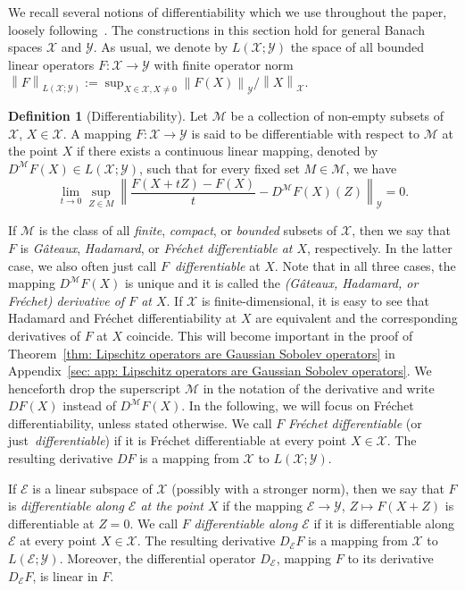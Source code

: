 \documentclass[namedate,webpdf]{ima-authoring-template-blank}
\newcommand*{\nm}[1]{{\left\|#1\right \|}}
\newcounter{counter}
\numberwithin{counter}{section}
\numberwithin{equation}{section}
\theoremstyle{plain}
\theoremstyle{definition}
\newtheorem{definition}[counter]{Definition}
\newcommand*{\cE}{\mathcal{E}}
\newcommand*{\cM}{\mathcal{M}}
\newcommand*{\cX}{\mathcal{X}}
\newcommand*{\cY}{\mathcal{Y}}
\theoremstyle{thmstyletwo}
\begin{document}
We recall several notions of differentiability which we use throughout the paper, loosely following~\citet[Ch. 5.1]{bogachev_GaussianMeasures_1998}. The constructions in this section hold for general Banach spaces \(\cX\) and \(\cY\). As usual, we denote by \(L(\cX; \cY)\) the space of all bounded linear operators \(F : \cX \to \cY\) with finite operator norm \(\nm{F}_{L(\cX; \cY)} := \sup_{X \in \cX, X \neq 0} \nm{F(X)}_{\cY} / \nm{X}_{\cX}\).

\begin{definition}[Differentiability]
    Let \(\cM\) be a collection of non-empty subsets of \(\cX\), \(X \in \cX\). A mapping \(F: \cX \to \cY\) is said to be differentiable with respect to \(\cM\) at the point \(X\) if there exists a continuous linear mapping, denoted by \(D^{\cM} F(X) \in L(\cX; \cY)\), such that for every fixed set \(M\in\cM\), we have 
    \[
    \lim_{t \to 0} \sup_{Z \in M} \nm{\frac{F(X + tZ) - F(X)}{t} - D^{\cM} F(X)(Z)}_{\cY} = 0.
    \]
\end{definition}

If \(\cM\) is the class of all \emph{finite}, \emph{compact}, or \emph{bounded} subsets of \(\cX\), then we say that \(F\) is \emph{G\^ateaux}, \emph{Hadamard}, or \emph{Fréchet differentiable at \(X\)}, respectively. In the latter case, we also often just call \(F\)~\emph{differentiable} at \(X\). Note that in all three cases, the mapping \( D^{\cM} F(X) \) is unique and it is called the \emph{(G\^ateaux, Hadamard, or Fréchet) derivative of \(F\) at \(X\)}. If \(\cX\) is finite-dimensional, it is easy to see that Hadamard and Fréchet differentiability at \(X\) are equivalent and the corresponding derivatives of \(F\) at \(X\) coincide. This will become important in the proof of Theorem~\ref{thm: Lipschitz operators are Gaussian Sobolev operators} in Appendix~\ref{sec: app: Lipschitz operators are Gaussian Sobolev operators}. We henceforth drop the superscript \(\cM\) in the notation of the derivative and write \(DF(X)\) instead of \(D^{\cM} F(X)\). In the following, we will focus on Fréchet differentiability, unless stated otherwise. We call \(F\) \emph{Fréchet differentiable} (or just~\emph{differentiable}) if it is Fréchet differentiable at every point \(X \in \cX\). The resulting derivative \(D F\) is a mapping from \(\cX\) to \(L(\cX; \cY)\). 

If \(\cE\) is a linear subspace of \(\cX\) (possibly with a stronger norm), then we say that \(F\) is \emph{differentiable along \(\cE\) at the point \(X\)} if the mapping \( \cE \to \cY \), \(Z \mapsto F(X + Z)\) is differentiable at \(Z = 0\). 
We call \(F\) \emph{differentiable along \(\cE\)} if it is differentiable along \(\cE\) at every point \(X \in \cX\). The resulting derivative \(D_{\cE} F\) is a mapping from \(\cX\) to \(L(\cE; \cY)\). Moreover, the differential operator \(D_{\cE}\), mapping \(F\) to its derivative \(D_{\cE} F\), is linear in \(F\).
\end{document}
